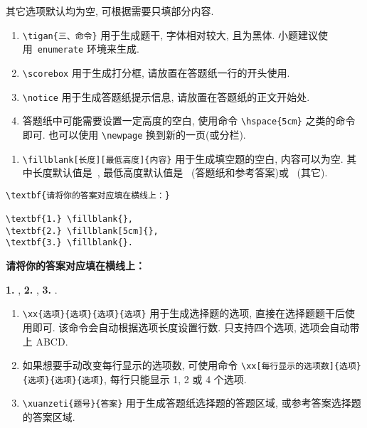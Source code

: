 \documentclass{hfutexam}
\begin{document}
其它选项默认均为空, 可根据需要只填部分内容.

\newpage
{}
\begin{enumerate}
\item \lstinline|\tigan{三、命令}| 用于生成题干, 字体相对较大, 且为黑体. 小题建议使用~{\color{blue}\lstinline|enumerate|} 环境来生成.
\item \hspace{-8mm}\scorebox\hspace{8mm}\lstinline|\scorebox| 用于生成打分框, 请放置在答题纸一行的开头使用.
\vspace{-2mm}
\item \lstinline|\notice| 用于生成答题纸提示信息, 请放置在答题纸的正文开始处.
\item 答题纸中可能需要设置一定高度的空白, 使用命令 \lstinline|\hspace{5cm}| 之类的命令即可. 也可以使用 \lstinline|\newpage| 换到新的一页(或分栏).
\end{enumerate}

\begin{enumerate}[resume]
\item \lstinline|\fillblank[长度][最低高度]{内容}| 用于生成填空题的空白, 内容可以为空. 其中长度默认值是~{\color{blue}{\lstinline|3.5cm|}}, 最低高度默认值是~{\color{blue}{\lstinline|1cm|}} (答题纸和参考答案)或~{\color{blue}{\lstinline|0.5cm|}} (其它).
\end{enumerate}

\textit{\color{blue}{填空题示例:}}
\begin{lstlisting}
\textbf{请将你的答案对应填在横线上：}

\textbf{1.} \fillblank{}, 
\textbf{2.} \fillblank[5cm]{}, 
\textbf{3.} \fillblank{}.
\end{lstlisting}

\begin{tcolorbox}
\textbf{请将你的答案对应填在横线上：}

\textbf{1.} \fillblank[3.5cm][1cm]{}, 
\textbf{2.} \fillblank[5cm][1cm]{}, 
\textbf{3.} \fillblank[3.5cm][1cm]{}.
\end{tcolorbox}

\begin{enumerate}[resume]
\item \lstinline|\xx{选项}{选项}{选项}{选项}| 用于生成选择题的选项, 直接在选择题题干后使用即可. 该命令会自动根据选项长度设置行数. 只支持四个选项, 选项会自动带上 ABCD.
\item 如果想要手动改变每行显示的选项数, 可使用命令 \lstinline|\xx[每行显示的选项数]{选项}{选项}{选项}{选项}|, 每行只能显示 1, 2 或 4 个选项.
\item \lstinline|\xuanzeti{题号}{答案}| 用于生成答题纸选择题的答题区域, 或参考答案选择题的答案区域.
\end{enumerate}
\end{document}
